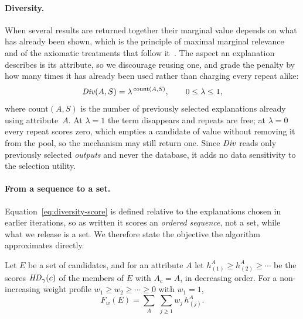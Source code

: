 \paragraph{Diversity.}
When several results are returned together their marginal value depends on what has already been shown, which is the principle of maximal marginal relevance~\cite{MMR} and of the axiomatic treatments that follow it~\cite{GollapudiS09,LinBilmes11}.
The aspect an explanation describes is its attribute, so we discourage reusing one, and grade the penalty by how many times it has already been used rather than charging every repeat alike:
\begin{equation}
\mathit{Div}(A,S)=\lambda^{\,\mathrm{count}(A,S)},
\qquad 0\le\lambda\le1,
\label{eq:diversity-score}
\end{equation}
where $\mathrm{count}(A,S)$ is the number of previously selected explanations already using attribute~$A$.
At $\lambda=1$ the term disappears and repeats are free; at $\lambda=0$ every repeat scores zero, which empties a candidate of value without removing it from the pool, so the mechanism may still return one.
Since $\mathit{Div}$ reads only previously selected \emph{outputs} and never the database, it adds no data sensitivity to the selection utility.

\paragraph{From a sequence to a set.}
Equation~\eqref{eq:diversity-score} is defined relative to the explanations chosen in earlier iterations, so as written it scores an \emph{ordered sequence}, not a set, while what we release is a set.
We therefore state the objective the algorithm approximates directly.

\begin{definition}
\label{def:setobj}
Let $E$ be a set of candidates, and for an attribute $A$ let
$h^A_{(1)}\ge h^A_{(2)}\ge\cdots$ be the scores $\mathit{HD}_\gamma(c)$ of the members of $E$ with $A_c=A$, in decreasing order.
For a non-increasing weight profile $w_1\ge w_2\ge\cdots\ge0$ with $w_1=1$,
\begin{equation}
F_w(E)=\sum_{A}\;\sum_{j\ge1} w_j\, h^A_{(j)} .
\label{eq:set-objective}
\end{equation}
\end{definition}

